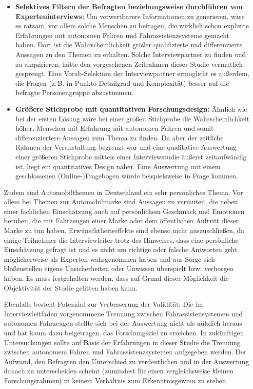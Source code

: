 \documentclass[12pt]{article}
\begin{document}
\begin{itemize}
  \item \textbf{Selektives Filtern der Befragten beziehungsweise durchführen von Experteninterviews:} Um verwertbarere Informationen zu generieren, wäre es ratsam, vor allem solche Menschen zu befragen, die wirklich schon explizite Erfahrungen mit autonomen Fahren und Fahrassistenzsysteme gemacht haben. Dort ist die Wahrscheinlichkeit größer qualifizierte und differenzierte Aussagen zu den Themen zu erhalten. Solche Interviewpartner zu finden und zu akquirieren, hätte den vorgesehenen Zeitrahmen dieser Studie vermutlich gesprengt. Eine Vorab-Selektion der Interviewpartner ermöglicht es außerdem, die Fragen (z.\,B. in Punkto Detailgrad und Komplexität) besser auf die befragte Personengruppe abzustimmen.
  \item \textbf{Größere Stichprobe mit quantitativen Forschungsdesign:} Ähnlich wie bei der ersten Lösung wäre bei einer großen Stichprobe die Wahrscheinlichkeit höher, Menschen mit Erfahrung mit autonomen Fahren und somit differenziertere Aussagen zum Thema zu finden. Da aber der zeitliche Rahmen der Veranstaltung begrenzt war und eine qualitative Auswertung einer größeren Stichprobe mittels einer Interviewstudie äußerst zeitaufwändig ist, liegt ein quantitatives Design näher. Eine Auswertung mit einem geschlossenen (Online-)Fragebogen würde beispielsweise in Frage kommen.
\end{itemize}

Zudem sind Automobilthemen in Deutschland ein sehr persönliches Thema. Vor allem bei Themen zur Automobilmarke sind Aussagen zu vermuten, die neben einer fachlichen Einschätzung auch auf persönlichem Geschmack und Emotionen beruhen, die mit Fahrzeugen einer Marke oder dem öffentlichen Auftritt dieser Marke zu tun haben. Erwünschtheitseffekte sind ebenso nicht auszuschließen, da einige Teilnehmer die Interviewleiter trotz des Hinweises, dass eine persönliche Einschätzung gefragt ist und es nicht um richtige oder falsche Antworten geht, möglicherweise als Experten wahrgenommen haben und aus Sorge sich bloßzustellen eigene Unsicherheiten oder Unwissen überspielt bzw. verborgen haben. Es muss festgehalten werden, dass auf Grund dieser Möglichkeit die Objektivität der Studie gelitten haben kann.

Ebenfalls besteht Potenzial zur Verbesserung der Validität. Die im Interviewleitfaden vorgenommene Trennung zwischen Fahrassistensystemen und autonomen Fahrzeugen stellte sich bei der Auswertung nicht als nützlich heraus und hat kaum dazu beigetragen, das Forschungsziel zu erreichen. In zukünftigen Untersuchungen sollte auf Basis der Erfahrungen in dieser Studie die Trennung zwischen autonomem Fahren und Fahrassistenzsystemen aufgegeben werden. Der Aufwand, den Befragten den Unterschied zu verdeutlichen und in der Auswertung danach zu unterscheiden scheint (zumindest für einen vergleichsweise kleinen Forschungsrahmen) in keinem Verhältnis zum Erkenntnisgewinn zu stehen.
\end{document}

